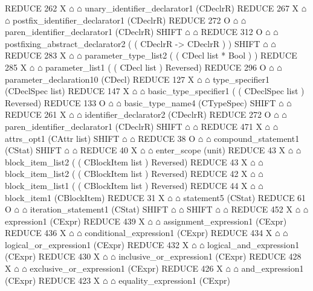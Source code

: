 \begin{isabellebody}
\begin{isamarkuptext}
\begin{isar}
       REDUCE 262 X $\house$ $\house$ unary_identifier_declarator1  (CDeclrR) 
        REDUCE 267 X $\house$ $\house$ postfix_identifier_declarator1  (CDeclrR) 
         REDUCE 272 O $\house$ $\house$ paren_identifier_declarator1  (CDeclrR) 
          SHIFT $\house$ $\house$ 
         REDUCE 312 O $\house$ $\house$ postfixing_abstract_declarator2  ( ( CDeclrR -> CDeclrR ) ) 
          SHIFT $\house$ $\house$ 
          REDUCE 283 X $\house$ $\house$ parameter_type_list2  ( ( CDecl list * Bool ) ) 
           REDUCE 285 X $\house$ $\house$ parameter_list1  ( ( CDecl list )  Reversed) 
            REDUCE 296 O $\house$ $\house$ parameter_declaration10  (CDecl) 
             REDUCE 127 X $\house$ $\house$ type_specifier1  (CDeclSpec list) 
              REDUCE 147 X $\house$ $\house$ basic_type_specifier1  ( ( CDeclSpec list )  Reversed) 
               REDUCE 133 O $\house$ $\house$ basic_type_name4  (CTypeSpec) 
                SHIFT $\house$ $\house$ 
             REDUCE 261 X $\house$ $\house$ identifier_declarator2  (CDeclrR) 
              REDUCE 272 O $\house$ $\house$ paren_identifier_declarator1  (CDeclrR) 
               SHIFT $\house$ $\house$ 
             REDUCE 471 X $\house$ $\house$ attrs_opt1  (CAttr list) 
          SHIFT $\house$ $\house$ 
     REDUCE 38 O $\house$ $\house$ compound_statement1  (CStat) 
      SHIFT $\house$ $\house$ 
      REDUCE 40 X $\house$ $\house$ enter_scope  (unit) 
      REDUCE 43 X $\house$ $\house$ block_item_list2  ( ( CBlockItem list )  Reversed) 
       REDUCE 43 X $\house$ $\house$ block_item_list2  ( ( CBlockItem list )  Reversed) 
        REDUCE 42 X $\house$ $\house$ block_item_list1  ( ( CBlockItem list )  Reversed) 
        REDUCE 44 X $\house$ $\house$ block_item1  (CBlockItem) 
         REDUCE 31 X $\house$ $\house$ statement5  (CStat) 
          REDUCE 61 O $\house$ $\house$ iteration_statement1  (CStat) 
           SHIFT $\house$ $\house$ 
           SHIFT $\house$ $\house$ 
           REDUCE 452 X $\house$ $\house$ expression1  (CExpr) 
            REDUCE 439 X $\house$ $\house$ assignment_expression1  (CExpr) 
             REDUCE 436 X $\house$ $\house$ conditional_expression1  (CExpr) 
              REDUCE 434 X $\house$ $\house$ logical_or_expression1  (CExpr) 
               REDUCE 432 X $\house$ $\house$ logical_and_expression1  (CExpr) 
                REDUCE 430 X $\house$ $\house$ inclusive_or_expression1  (CExpr) 
                 REDUCE 428 X $\house$ $\house$ exclusive_or_expression1  (CExpr) 
                  REDUCE 426 X $\house$ $\house$ and_expression1  (CExpr) 
                   REDUCE 423 X $\house$ $\house$ equality_expression1  (CExpr) 

\end{isar}
\end{isamarkuptext}
\end{isabellebody}
